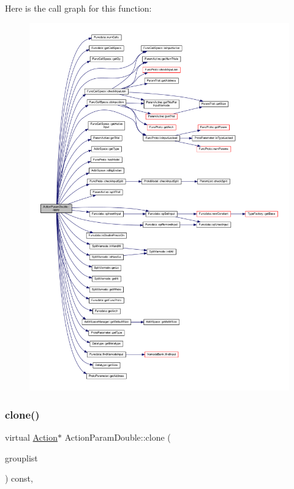 Here is the call graph for this function\+:
\nopagebreak
\begin{figure}[H]
\begin{center}
\leavevmode
\includegraphics[width=350pt]{class_action_param_double_a8aad0e7534680ca4a79a20c196da103c_cgraph}
\end{center}
\end{figure}
\mbox{\label{class_action_param_double_a0db428f4c947a73829164f43f4321d78}} 
\subsubsection{\texorpdfstring{clone()}{clone()}}
{\footnotesize\ttfamily virtual \mbox{\hyperlink{class_action}{Action}}$\ast$ Action\+Param\+Double\+::clone (\begin{DoxyParamCaption}\item[{const \mbox{\hyperlink{class_action_group_list}{Action\+Group\+List}} \&}]{grouplist }\end{DoxyParamCaption}) const\hspace{0.3cm}{\ttfamily [inline]}, {\ttfamily [virtual]}}



